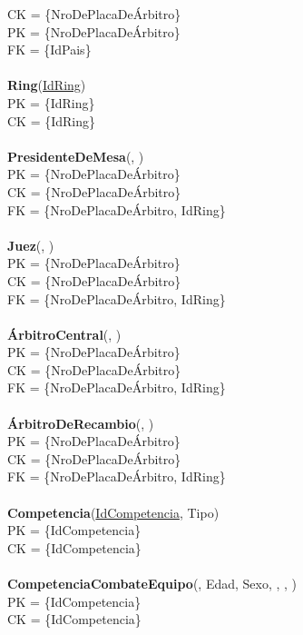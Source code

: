 CK = \{NroDePlacaDeÁrbitro\}\\
PK = \{NroDePlacaDeÁrbitro\}\\
FK = \{IdPais\}\\
\\
\textbf{Ring}(\uline{IdRing})\\
PK = \{IdRing\}\\
CK = \{IdRing\}\\
\\
\textbf{PresidenteDeMesa}(, )\\
PK = \{NroDePlacaDeÁrbitro\}\\
CK = \{NroDePlacaDeÁrbitro\}\\
FK = \{NroDePlacaDeÁrbitro, IdRing\}\\
\\
\textbf{Juez}(, )\\
PK = \{NroDePlacaDeÁrbitro\}\\
CK = \{NroDePlacaDeÁrbitro\}\\
FK = \{NroDePlacaDeÁrbitro, IdRing\}\\
\\
\textbf{ÁrbitroCentral}(, )\\
PK = \{NroDePlacaDeÁrbitro\}\\
CK = \{NroDePlacaDeÁrbitro\}\\
FK = \{NroDePlacaDeÁrbitro, IdRing\}\\
\\
\textbf{ÁrbitroDeRecambio}(, )\\
PK = \{NroDePlacaDeÁrbitro\}\\
CK = \{NroDePlacaDeÁrbitro\}\\
FK = \{NroDePlacaDeÁrbitro, IdRing\}\\
\\
\textbf{Competencia}(\uline{IdCompetencia}, Tipo)\\
PK = \{IdCompetencia\}\\
CK = \{IdCompetencia\}\\
\\
\textbf{CompetenciaCombateEquipo}(, Edad, Sexo, , , )\\
PK = \{IdCompetencia\}\\
CK = \{IdCompetencia\}\\
